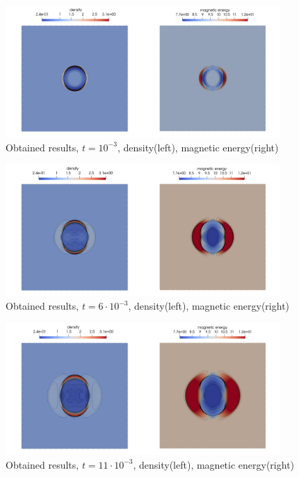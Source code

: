 \vspace{-5mm}
\begin{figure}[H]
	\begin{center}
		\includegraphics[width=0.93\textwidth]{img/mhd-blast/old/mynew1.jpg}
	\caption{Obtained results, $t = 10^{-3}$, density(left), magnetic energy(right)}
	\label{figure:blastOldMy1}
	\end{center}
\end{figure}
\vspace{-8mm}

\begin{figure}[H]
	\begin{center}
		\includegraphics[width=0.93\textwidth]{img/mhd-blast/old/mynew2.jpg}
	\caption{Obtained results, $t = 6\cdot 10^{-3}$, density(left), magnetic energy(right)}
	\label{figure:blastOldMy2}
	\end{center}
\end{figure}
\vspace{-8mm}

\begin{figure}[H]
	\begin{center}
		\includegraphics[width=0.93\textwidth]{img/mhd-blast/old/mynew3.jpg}
	\caption{Obtained results, $t = 11\cdot 10^{-3}$, density(left), magnetic energy(right)}
	\label{figure:blastOldMy3}
	\end{center}
\end{figure}
\vspace{-8mm}

